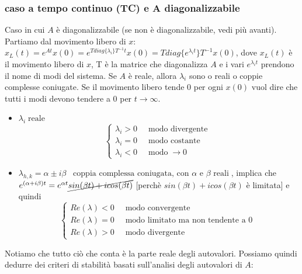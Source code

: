 \subsubsection*{caso a tempo continuo (TC) e A diagonalizzabile}
Caso in cui $A$ è diagonalizzabile (se non è diagonalizzabile, vedi più avanti).\newline
\newline
Partiamo dal movimento libero di $x$: $x_L (t) = e^{At} x(0) = e^{T diag\{\lambda_i\}T^{-1} t}x(0) = T diag\{e^{\lambda_i t}\}T^{-1}x(0)$, dove $x_L(t)$ è il movimento libero di $x$, T è la matrice che diagonalizza $A$ e i vari $e^{\lambda_it}$ prendono il nome di modi del sistema.\newline
\newline
Se $A$ è reale, allora $\lambda_i$ sono o reali o coppie complesse coniugate.\newline
\newline
Se il movimento libero tende $0$ per ogni $x(0)$ vuol dire che tutti i modi devono tendere a $0$ per $t \rightarrow \infty$.
\begin{itemize}
    \item $\lambda_i \; \text{reale}$
    \[
        \begin{cases}
            \lambda_i >0 \;\;& \text{modo divergente}\;\\
            \lambda_i =0 \;\;& \text{modo costante}\;\\
            \lambda_i <0 \;\;& \text{modo}\;\rightarrow  0
        \end{cases}
    \]
    \item $\lambda_{h,k} = \alpha \pm i \beta \;\;\;\text{coppia complessa coniugata, con $\alpha$ e $\beta$ reali}\;$, implica che $e^{(\alpha + i \beta)t} = e^{\alpha t} \cancel{sin(\beta t) + i cos(\beta t)}$ [perchè $sin(\beta t) + i cos(\beta t)$ è limitata] e quindi
    \[
        \begin{cases}
            Re(\lambda) < 0 \;\; & \text{modo convergente}\;\\
            Re(\lambda) = 0 \;\; & \text{modo limitato ma non tendente a $0$}\;\\
            Re(\lambda) > 0 \;\; & \text{modo divergente}\;
        \end{cases}
    \]
\end{itemize}
Notiamo che tutto ciò che conta è la parte reale degli autovalori.\newline
\newline
Possiamo quindi dedurre dei criteri di stabilità basati sull'analisi degli autovalori di $A$:

